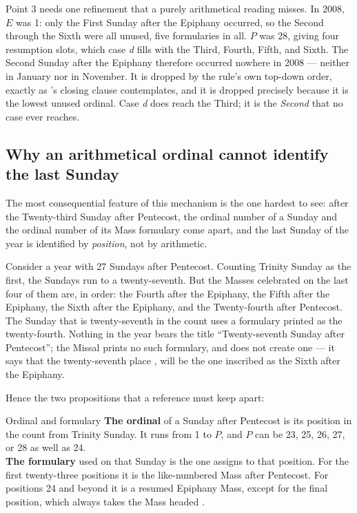Point 3 needs one refinement that a purely arithmetical reading misses. In 2008, $E$ was 1: only
the First Sunday after the Epiphany occurred, so the Second through the Sixth were all unused,
five formularies in all. $P$ was 28, giving four resumption slots, which case \textit{d} fills
with the Third, Fourth, Fifth, and Sixth. The Second Sunday after the Epiphany therefore
occurred nowhere in 2008 — neither in January nor in November. It is dropped by the rule's own
top-down order, exactly as 's closing clause contemplates, and it is dropped precisely
because it is the lowest unused ordinal. Case \textit{d} does reach the Third; it is the
\emph{Second} that no case ever reaches.

\subsection{Why an arithmetical ordinal cannot identify the last Sunday}

The most consequential feature of this mechanism is the one hardest to see: after the
Twenty-third Sunday after Pentecost, the ordinal number of a Sunday and the ordinal number of
its Mass formulary come apart, and the last Sunday of the year is identified by \emph{position},
not by arithmetic.

Consider a year with 27 Sundays after Pentecost. Counting Trinity Sunday as the first, the
Sundays run to a twenty-seventh. But the Masses celebrated on the last four of them are, in
order: the Fourth after the Epiphany, the Fifth after the Epiphany, the Sixth after the
Epiphany, and the Twenty-fourth after Pentecost. The Sunday that is twenty-seventh in the count
uses a formulary printed as the twenty-fourth. Nothing in the year bears the title
``Twenty-seventh Sunday after Pentecost''; the Missal prints no such formulary, and  does
not create one — it says that the twenty-seventh place , will be the one inscribed as the Sixth after the Epiphany.

Hence the two propositions that a reference must keep apart:

\begin{studybox}{Ordinal and formulary}
\textbf{The ordinal} of a Sunday after Pentecost is its position in the count from Trinity
Sunday. It runs from 1 to $P$, and $P$ can be 23, 25, 26, 27, or 28 as well as 24.\\[0.35em]
\textbf{The formulary} used on that Sunday is the one  assigns to that position. For the
first twenty-three positions it is the like-numbered Mass after Pentecost. For positions 24 and
beyond it is a resumed Epiphany Mass, except for the final position, which always takes the
Mass headed .
\end{studybox}

